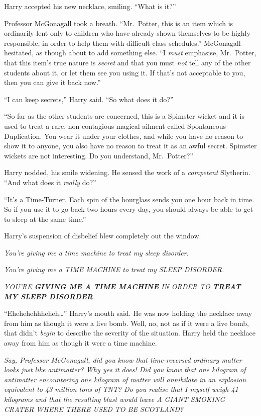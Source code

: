 Harry accepted his new necklace, smiling. ``What is it?''

Professor McGonagall took a breath. ``Mr.~Potter, this is an item which
is ordinarily lent only to children who have already shown themselves to
be highly responsible, in order to help them with difficult class
schedules.'' McGonagall hesitated, as though about to add something
else. ``I \emph{must} emphasise, Mr.~Potter, that this item's true
nature is \emph{secret} and that you must \emph{not} tell any of the
other students about it, or let them see you using it. If that's not
acceptable to you, then you can give it back now.''

``I can keep secrets,'' Harry said. ``So what does it do?''

``So far as the other students are concerned, this is a Spimster wicket
and it is used to treat a rare, non-contagious magical ailment called
Spontaneous Duplication. You wear it under your clothes, and while you
have no reason to show it to anyone, you also have no reason to treat it
as an awful secret. Spimster wickets are not interesting. Do you
understand, Mr.~Potter?''

Harry nodded, his smile widening. He sensed the work of a
\emph{competent} Slytherin. ``And what does it \emph{really} do?''

``It's a Time-Turner. Each spin of the hourglass sends you one hour back
in time. So if you use it to go back two hours every day, you should
always be able to get to sleep at the same time.''

Harry's suspension of disbelief blew completely out the window.

\emph{You're giving me a time machine to treat my sleep disorder.}

\emph{You're giving me a TIME MACHINE to treat my SLEEP DISORDER.}

\emph{YOU'RE \textbf{GIVING ME A TIME MACHINE} IN ORDER TO \textbf{TREAT
MY SLEEP DISORDER}.}

``Ehehehehhheheh\ldots{}'' Harry's mouth said. He was now holding the
necklace away from him as though it were a live bomb. Well, no, not as
if it were a live bomb, that didn't \emph{begin} to describe the
severity of the situation. Harry held the necklace away from him as
though it were a time machine.

\emph{Say, Professor McGonagall, did you know that time-reversed
ordinary matter looks just like antimatter? Why yes it does! Did you
know that one kilogram of antimatter encountering one kilogram of matter
will annihilate in an explosion equivalent to 43 million tons of TNT? Do
you realise that I myself weigh 41 kilograms and that the resulting
blast would leave A GIANT SMOKING CRATER WHERE THERE USED TO BE
SCOTLAND?}

